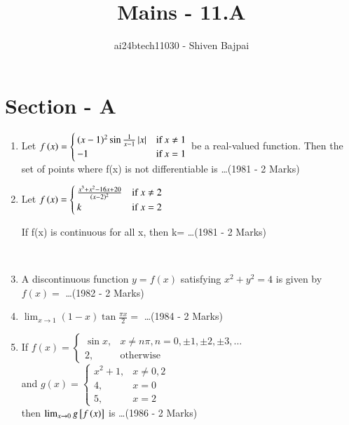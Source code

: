 \documentclass[journal]{IEEEtran}
\begin{document}
\onecolumn

\vspace{3cm}

\renewcommand{\thefigure}{\theenumi}
\renewcommand{\thetable}{\theenumi}

\title{Mains - 11.A}
\author{ai24btech11030 - Shiven Bajpai}
\maketitle

\section*{Section - A}
\begin{enumerate}
\item{ 
    Let $f\left(x\right)= \begin{cases}
	   (x-1)^2 \sin\frac{1}{x-1}\left\vert x\right\vert & \text{if} \: x\ne1 \\
      -1 & \text{if} \: x = 1 
    \end{cases} $
    be a real-valued function. Then the set of points where f(x) is not differentiable is \ldots \hfill (1981 - 2 Marks)
}\\

\item{
    Let $f\left(x\right)= \begin{cases}
    \frac{x^3+x^2-16x+20}{(x-2)^2}& \text{if } x \ne 2\\
    k& \text{if } x = 2
    \end{cases}$
    
    If f(x) is continuous for all x, then k= \ldots \hfill(1981 - 2 Marks)
}\\


\item{
    A discontinuous function $y=f(x)$ satisfying $x^2 + y^2 = 4$ is given by $f(x)=$ \ldots \hfill (1982 - 2 Marks)
}\\

\item {
    $\lim_{x\to1} (1-x) \tan\frac{\pi x}{2} = $ \ldots \hfill (1984 - 2 Marks)
}\\
    
\item {
    If $f(x)= \begin{cases}\sin x,& x \ne n\pi, n = 0, \pm1, \pm2, \pm3, \ldots \\
    2,& \text{otherwise}\end{cases}$\\
    and $g(x) = \begin{cases}x^2 + 1,& x \ne 0, 2\\
    4,& x=0\\
    5,& x=2\end{cases}$\\
    then $\lim_{x\to0} g{}\left[f\left(x\right)\right]$ is \ldots \hfill(1986 - 2 Marks)
}\\


\end{enumerate}
\end{document}
